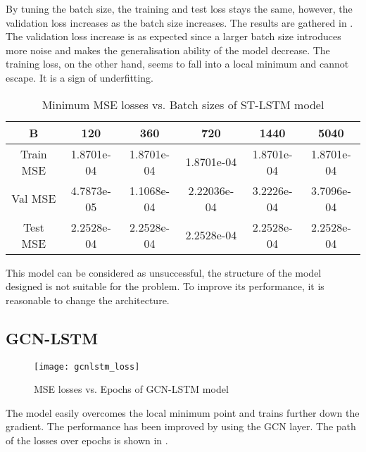 By tuning the batch size, the training and test loss stays the same, however, the validation loss increases as the batch size increases. 
The results are gathered in . The validation loss increase is as expected since a larger batch size introduces more noise and makes the generalisation ability of the model decrease. 
The training loss, on the other hand, seems to fall into a local minimum and cannot escape. It is a sign of underfitting. 

\begin{table}[!htb]
    \centering
    \begin{tabular}{c|ccccc}
    \toprule
    B & 120 & 360 & 720 & 1440 & 5040 \\
    \midrule
    Train MSE & 1.8701e-04 & 1.8701e-04 & 1.8701e-04 & 1.8701e-04 & 1.8701e-04 \\
    Val MSE & 4.7873e-05 & 1.1068e-04 & 2.22036e-04 & 3.2226e-04 & 3.7096e-04 \\
    Test MSE & 2.2528e-04 & 2.2528e-04 & 2.2528e-04 & 2.2528e-04 & 2.2528e-04 \\
    \bottomrule
    \end{tabular}
    \caption{Minimum MSE losses vs. Batch sizes of ST-LSTM model}
    \label{Table:stlstm-batchsize}
\end{table}

This model can be considered as unsuccessful, the structure of the model designed is not suitable for the problem. 
To improve its performance, it is reasonable to change the architecture. 

\subsection{GCN-LSTM}

\begin{figure}[!htb]
    \centering
    \texttt{[image: gcnlstm\_loss]}
    \caption{MSE losses vs. Epochs of GCN-LSTM model}
    \label{Figure:gcnlstm_loss}
\end{figure}

The model easily overcomes the local minimum point and trains further down the gradient. 
The performance has been improved by using the GCN layer. The path of the losses over epochs is shown in .
